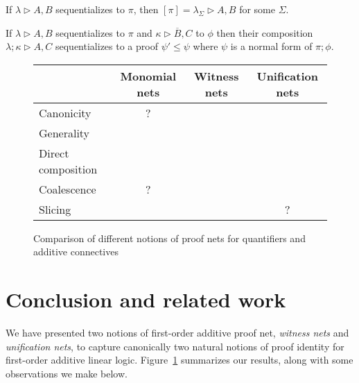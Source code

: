 \documentclass[a4paper,UKenglish]{lipics-v2019}
\newcommand\xmark{{\color{red}\ding{55}}}
\newcommand\vmark{{\color{green}\ding{51}}}
\newcommand\+{+}
\renewcommand\*{\times}
\newcommand\dual[1]{\overline{#1}}
\newcommand\net[3]{#1\triangleright #2,#3}
\newcommand\comp{\mathbin;}
\begin{document}
\begin{theorem}
\label{thm:unet seq-deseq}
If $\net\lambda AB$ sequentializes to $\pi$, then $[\pi]=\net{\lambda_\Sigma} AB$ for some $\Sigma$.
\end{theorem}


\begin{theorem}
\label{thm:unet composition}
If $\net\lambda AB$ sequentializes to $\pi$ and $\net\kappa{\dual B}C$ to $\phi$ then their composition $\net{\lambda\comp\kappa}AC$ sequentializes to a proof $\psi'\leq\psi$ where $\psi$ is a normal form of $\pi\comp\phi$.
\end{theorem}

\begin{figure}[!t]
\begin{center}
\begin{tabular}{lccc}
 &	Monomial nets & Witness nets & Unification nets
\\\hline
   Canonicity          &    ?   & \vmark & \vmark
\\ Generality          & \xmark & \xmark & \vmark
\\ Direct composition  & \xmark & \vmark & \vmark
\\ Coalescence         &    ?   & \vmark & \vmark
\\ Slicing             & \vmark & \vmark &   ?
\end{tabular}  
  \caption{Comparison of different notions of proof nets for quantifiers and additive connectives}
  \label{fig:results}
\end{center}
\vskip-8pt
\end{figure}


\section{Conclusion and related work}

We have presented two notions of first-order additive proof net, \emph{witness nets} and \emph{unification nets}, to capture canonically two natural notions of proof identity for first-order additive linear logic. Figure~\ref{fig:results} summarizes our results, along with some observations we make below. 
\end{document}
